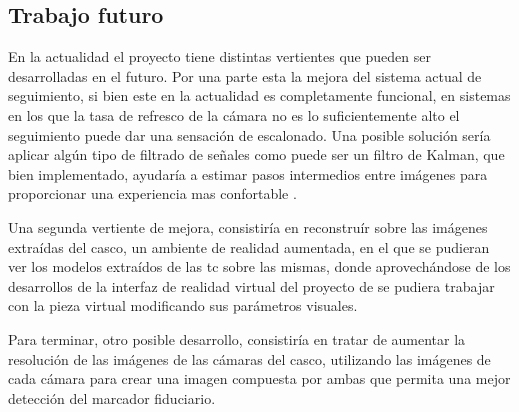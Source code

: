 \subsection{Trabajo futuro}
En la actualidad el proyecto tiene distintas vertientes que pueden ser desarrolladas en el futuro. Por una parte esta la mejora del sistema actual de seguimiento, si bien este en la actualidad es completamente funcional, en sistemas en los que la tasa de refresco de la cámara no es lo suficientemente alto el seguimiento puede dar una sensación de escalonado. Una posible solución sería aplicar algún tipo de filtrado de señales como puede ser un filtro de Kalman, que bien implementado, ayudaría a estimar pasos intermedios entre imágenes para proporcionar una experiencia mas confortable \cite{welch2020kalman}.

Una segunda vertiente de mejora, consistiría en reconstruír sobre las imágenes extraídas del casco, un ambiente de realidad aumentada, en el que se pudieran ver los modelos extraídos de las \acrshort{tc} sobre las mismas, donde aprovechándose de los desarrollos de la interfaz de realidad virtual del proyecto de \citeauthor{IglesiasGuitian2022} se pudiera trabajar con la pieza virtual modificando sus parámetros visuales.

Para terminar, otro posible desarrollo, consistiría en tratar de aumentar la resolución de las imágenes de las cámaras del casco, utilizando las imágenes de cada cámara para crear una imagen compuesta por ambas que permita una mejor detección del marcador fiduciario.